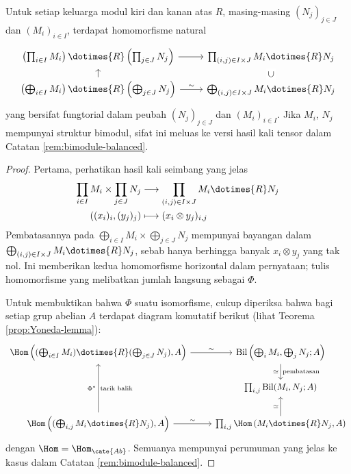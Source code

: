 \begin{proposition}\label{prop:tensor-direct-sum}
	Untuk setiap keluarga modul kiri dan kanan atas $R$, masing-masing $(N_j)_{j \in J}$ dan $(M_i)_{i \in I}$, terdapat homomorfisme natural
	\[\begin{tikzcd}[row sep=small]
		\left( \prod_{i \in I} M_i\right) \dotimes{R} \left( \prod_{j \in J} N_j \right) \arrow[r] & \prod_{(i,j) \in I \times J} M_i \dotimes{R} N_j \\
		\left( \bigoplus_{i \in I} M_i\right) \dotimes{R} \left( \bigoplus_{j \in J} N_j \right) \arrow[r, "\sim"] \arrow[u] & \bigoplus_{(i,j) \in I \times J} M_i \dotimes{R} N_j \arrow[phantom, u, sloped, "\subset" description]
	\end{tikzcd}\]
	yang bersifat fungtorial dalam peubah $(N_j)_{j \in J}$ dan $(M_i)_{i \in I}$. Jika $M_i$, $N_j$ mempunyai struktur bimodul, sifat ini meluas ke versi hasil kali tensor dalam Catatan \ref{rem:bimodule-balanced}.
\end{proposition}
\begin{proof}
	Pertama, perhatikan hasil kali seimbang yang jelas
	\begin{align*}
		\prod_{i \in I} M_i \times \prod_{j \in J} N_j & \longrightarrow \prod_{(i,j) \in I \times J} M_i \dotimes{R} N_j \\
		((x_i)_i, (y_j)_j) & \longmapsto (x_i \otimes y_j)_{i,j}
	\end{align*}
	Pembatasannya pada $\bigoplus_{i \in I} M_i \times \bigoplus_{j \in J} N_j$ mempunyai bayangan dalam $\bigoplus_{(i,j) \in I \times J} M_i \dotimes{R} N_j$, sebab hanya berhingga banyak $x_i \otimes y_j$ yang tak nol. Ini memberikan kedua homomorfisme horizontal dalam pernyataan; tulis homomorfisme yang melibatkan jumlah langsung sebagai $\Phi$.

	Untuk membuktikan bahwa $\Phi$ suatu isomorfisme, cukup diperiksa bahwa bagi setiap grup abelian $A$ terdapat diagram komutatif berikut (lihat Teorema \ref{prop:Yoneda-lemma}):
	\[\begin{tikzcd}
		\Hom \left( (\bigoplus_{i \in I} M_i) \dotimes{R} (\bigoplus_{j \in J} N_j) , A \right) \arrow[r, "\sim"] & \text{Bil}\left( \bigoplus_i M_i, \bigoplus_j N_j; A \right) \arrow[d, "\text{pembatasan}", "\simeq"'] \\
		& \prod_{i,j} \text{Bil}(M_i, N_j; A) \\
		\Hom\left( (\bigoplus_{i,j} M_i \dotimes{R} N_j), A \right) \arrow[r, "\sim"] \arrow[uu, "\Phi^*", "\text{tarik balik}"'] & \prod_{i,j} \Hom\left( M_i \dotimes{R} N_j, A \right) \arrow[u, "\simeq"]
	\end{tikzcd}\]
	dengan $\Hom = \Hom_{\cate{Ab}}$. Semuanya mempunyai perumuman yang jelas ke kasus dalam Catatan \ref{rem:bimodule-balanced}.
\end{proof}

